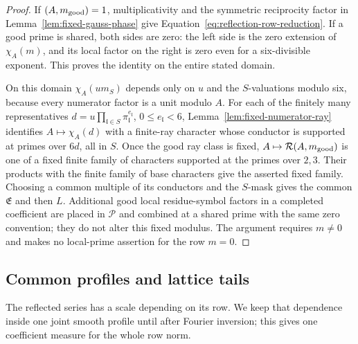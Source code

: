 \documentclass[11pt,a4paper]{article}
\numberwithin{equation}{section}
\numberwithin{figure}{section}
\theoremstyle{definition}
\theoremstyle{remark}
\begin{document}
\begin{proof}
If $(A,m_{\rm good})=1$, multiplicativity and the symmetric reciprocity
factor in Lemma~\ref{lem:fixed-gauss-phase} give
Equation~\eqref{eq:reflection-row-reduction}.  If a good prime is shared,
both sides are zero: the left side is the zero extension of $\chi_A(m)$,
and its local factor on the right is zero even for a six-divisible exponent.
This proves the identity on the entire stated domain.

On this domain $\chi_A(u m_S)$ depends only on $u$ and the $S$-valuations
modulo six, because every numerator factor is a unit modulo $A$.  For each
of the finitely many representatives
$d=u\prod_{\mathfrak l\in S}\pi_{\mathfrak l}^{e_{\mathfrak l}}$,
$0\le e_{\mathfrak l}<6$, Lemma~\ref{lem:fixed-numerator-ray} identifies
$A\mapsto\chi_A(d)$ with a finite-ray character whose conductor is supported
at primes over $6d$, all in $S$.  Once the good ray class is fixed,
$A\mapsto\mathcal R(A,m_{\rm good})$ is one of a fixed finite family of
characters supported at the primes over $2,3$.  Their products with the
finite family of base characters give the asserted fixed family.  Choosing
a common multiple of its conductors and the $S$-mask gives the common
$\mathfrak E$ and then $L$.  Additional good local residue-symbol factors in
a completed coefficient are placed in $\mathcal P$ and combined at a shared
prime with the same zero convention; they do not alter this fixed modulus.
The argument requires $m\ne0$ and makes no local-prime assertion for the row
$m=0$.
\end{proof}

\subsection{Common profiles and lattice tails}

The reflected series has a scale depending on its row.  We keep that
dependence inside one joint smooth profile until after Fourier inversion;
this gives one coefficient measure for the whole row norm.
\end{document}

